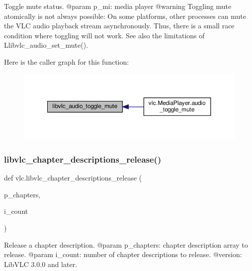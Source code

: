 \begin{DoxyVerb}Toggle mute status.
@param p_mi: media player @warning Toggling mute atomically is not always possible: On some platforms, other processes can mute the VLC audio playback stream asynchronously. Thus, there is a small race condition where toggling will not work. See also the limitations of L{libvlc_audio_set_mute}().
\end{DoxyVerb}
 Here is the caller graph for this function\+:
\nopagebreak
\begin{figure}[H]
\begin{center}
\leavevmode
\includegraphics[width=350pt]{namespacevlc_ad72cfaafb813c822567cc1a8fcfc8429_icgraph}
\end{center}
\end{figure}
\mbox{\label{namespacevlc_a57028e9c3f2b8ddc8722423bb560e2f7}} 
\subsubsection{\texorpdfstring{libvlc\+\_\+chapter\+\_\+descriptions\+\_\+release()}{libvlc\_chapter\_descriptions\_release()}}
{\footnotesize\ttfamily def vlc.\+libvlc\+\_\+chapter\+\_\+descriptions\+\_\+release (\begin{DoxyParamCaption}\item[{}]{p\+\_\+chapters,  }\item[{}]{i\+\_\+count }\end{DoxyParamCaption})}

\begin{DoxyVerb}Release a chapter description.
@param p_chapters: chapter description array to release.
@param i_count: number of chapter descriptions to release.
@version: LibVLC 3.0.0 and later.
\end{DoxyVerb}
 \mbox{\label{namespacevlc_ae40baed0009415ac5d90fe5fce6a0c7f}} 
